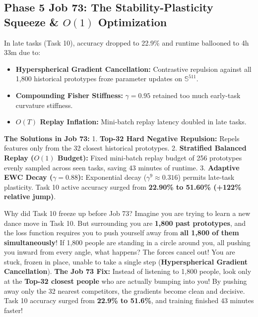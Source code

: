 \documentclass[11pt,a4paper]{article}
\begin{document}
\subsection{Phase 5 Job 73: The Stability-Plasticity Squeeze \& $O(1)$ Optimization}
In late tasks (Task 10), accuracy dropped to 22.9\% and runtime ballooned to 4h 33m due to:
\begin{itemize}[noitemsep]
    \item \textbf{Hyperspherical Gradient Cancellation:} Contrastive repulsion against all 1,800 historical prototypes froze parameter updates on $\mathbb{S}^{511}$.
    \item \textbf{Compounding Fisher Stiffness:} $\gamma = 0.95$ retained too much early-task curvature stiffness.
    \item \textbf{$O(T)$ Replay Inflation:} Mini-batch replay latency doubled in late tasks.
\end{itemize}
\textbf{The Solutions in Job 73:}
1. \textbf{Top-32 Hard Negative Repulsion:} Repels features only from the 32 closest historical prototypes.
2. \textbf{Stratified Balanced Replay ($O(1)$ Budget):} Fixed mini-batch replay budget of 256 prototypes evenly sampled across seen tasks, saving 43 minutes of runtime.
3. \textbf{Adaptive EWC Decay ($\gamma = 0.88$):} Exponential decay ($\gamma^9 \approx 0.316$) permits late-task plasticity.
Task 10 active accuracy surged from \textbf{22.90\% to 51.60\% (+122\% relative jump)}.

\begin{callout}
Why did Task 10 freeze up before Job 73?\newline
Imagine you are trying to learn a new dance move in Task 10. But surrounding you are \textbf{1,800 past prototypes}, and the loss function requires you to push yourself away from \textbf{all 1,800 of them simultaneously}!\newline
If 1,800 people are standing in a circle around you, all pushing you inward from every angle, what happens? The forces cancel out! You are stuck, frozen in place, unable to take a single step (\textbf{Hyperspherical Gradient Cancellation}).\newline
\textbf{The Job 73 Fix:} Instead of listening to 1,800 people, look only at the \textbf{Top-32 closest people} who are actually bumping into you! By pushing away only the 32 nearest competitors, the gradients become clean and decisive. Task 10 accuracy surged from \textbf{22.9\% to 51.6\%}, and training finished 43 minutes faster!
\end{callout}
\end{document}
